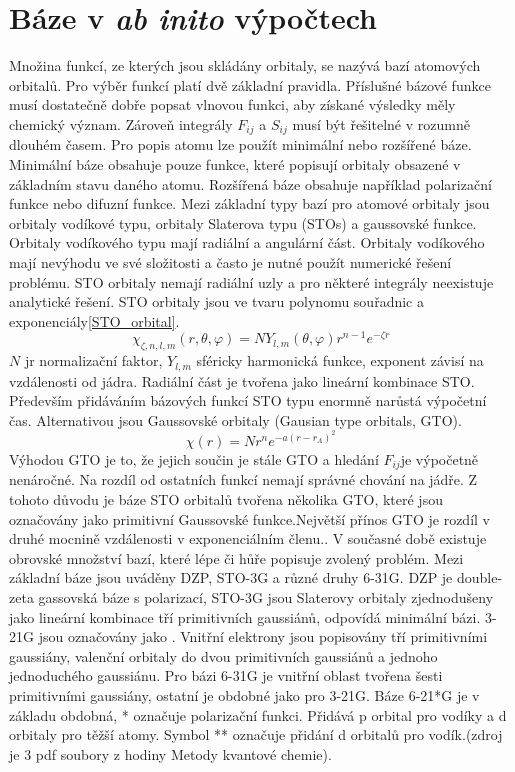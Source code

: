 \documentclass[
  digital, %
  table,   %
  lof,     %
  lot,     %
]{fithesis3}
\begin{document}
\section{Báze v \textit{ab inito} výpočtech }\label{kapitola_baze}
Množina funkcí, ze kterých jsou skládány orbitaly, se nazývá bazí atomových orbitalů. Pro výběr funkcí platí dvě základní pravidla. Příslušné bázové funkce musí dostatečně dobře popsat vlnovou funkci, aby získané výsledky měly chemický význam. Zároveň integrály $F_{ij}$ a $S_{ij}$ musí být řešitelné v rozumně dlouhém časem. \cite{lowe2011quantum}
Pro popis atomu lze použít minimální nebo rozšířené báze. Minimální báze obsahuje pouze funkce, které popisují orbitaly obsazené v základním stavu daného atomu. Rozšířená báze obsahuje například polarizační funkce nebo difuzní funkce. Mezi základní typy bazí pro atomové orbitaly jsou orbitaly vodíkové typu, orbitaly Slaterova typu (STOs) a gaussovské funkce. \cite{dftshrnutivysledky}
Orbitaly vodíkového typu mají radiální a angulární část. Orbitaly vodíkového mají nevýhodu ve své složitosti a často je nutné použít numerické řešení problému. STO orbitaly nemají radiální uzly a pro některé integrály neexistuje analytické řešení. STO orbitaly jsou ve tvaru polynomu souřadnic a exponenciály\ref{STO_orbital}.\cite{jensen2007introduction}
\begin{equation}
\chi_{\zeta, n, l, m}(r, \theta, \varphi) = NY_{l,m} (\theta, \varphi) r^{n-1} e^{-\zeta r}
\label{STO_orbital} 
\end{equation}
$N$ jr normalizační faktor, $Y_{l,m}$ sféricky harmonická funkce, exponent závisí na vzdálenosti od jádra. Radiální část je tvořena jako lineární kombinace STO. Především přidáváním bázových funkcí STO typu enormně narůstá výpočetní čas. Alternativou jsou Gaussovské orbitaly (Gausian type orbitals, GTO).
\begin{equation}
\chi(r) = Nr^n e^{-a(r-r_A)^2}
\end{equation}
 Výhodou GTO je to, že jejich součin je stále GTO a hledání $F_{ij}$je výpočetně nenáročné. Na rozdíl od ostatních funkcí nemají správné chování na jádře. Z tohoto důvodu je báze STO orbitalů tvořena několika GTO, které jsou označovány jako primitivní Gaussovské funkce.Největší přínos GTO je rozdíl v druhé mocnině vzdálenosti v exponenciálním členu.\cite{lowe2011quantum}. 
 V současné době existuje obrovské množství bazí, které lépe či hůře popisuje zvolený problém. Mezi základní báze jsou uváděny DZP, STO-3G a různé druhy 6-31G. DZP je double-zeta gassovská báze s polarizací, STO-3G jsou Slaterovy orbitaly zjednodušeny jako lineární kombinace tří primitivních gaussiánů, odpovídá minimální bázi. 3-21G jsou označovány jako . Vnitřní elektrony jsou popisovány tří primitivními gaussiány, valenční orbitaly  do dvou primitivních gaussiánů a jednoho jednoduchého gaussiánu. Pro bázi 6-31G je vnitřní oblast tvořena šesti primitivními gaussiány, ostatní je obdobné jako pro 3-21G. Báze 6-21*G je v základu obdobná, * označuje polarizační funkci. Přidává p orbital pro vodíky a d orbitaly pro těžší atomy. Symbol ** označuje přidání d orbitalů pro vodík.(zdroj je 3 pdf soubory z hodiny Metody kvantové chemie). \\
\end{document}
